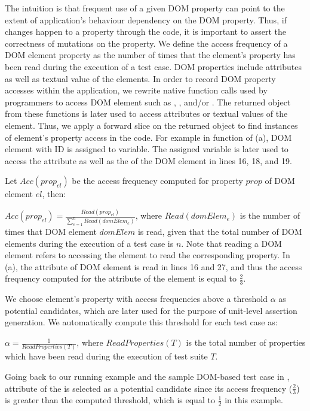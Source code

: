 The intuition is that frequent use of a given DOM property can point to the extent of application's behaviour dependency on the DOM property. Thus, if changes happen to a property through the \javascript code, it is important to assert the correctness of mutations on the property. We define the access frequency of a DOM element property as the number of times that the element's property has been read during the execution of a test case. DOM properties include attributes as well as textual value of the elements.
In order to record DOM property accesses within the application, we rewrite native function calls used by programmers to access DOM element such as , , and/or . The returned object from these functions is later used to access attributes or textual values of the element. Thus, we apply a forward slice on the returned object to find instances of element's property access in the code.
For example in function  of (a), DOM element with ID  is assigned to  variable. The assigned variable is later used to access the  attribute as well as the 
of the DOM element in lines 16, 18, and 19.

Let $Acc(prop_{el})$ be the access frequency computed for property $prop$ of DOM element $el$, then:
 
$Acc(prop_{el})=\frac{Read(prop_{el})}{\sum _{e=1}^{n} Read(domElem_e)}$, where $Read(domElem_{e})$ is the number of times that DOM element $domElem$ is read, given that the total number of DOM elements during the execution of a test case is $n$.
Note that reading a DOM element refers to accessing the element to read the corresponding property. In (a), the  attribute of DOM element  is read in lines 16 and 27, and thus the access frequency
computed for the  attribute of the element is equal to $\frac{2}{3}$.

We choose element's property with access frequencies above a threshold $\alpha$ as potential candidates, which are later used for the purpose of unit-level assertion generation. We automatically compute this threshold for each test case as: 

$\alpha=\frac{1}{ReadProperties(T)}$, where $ReadProperties(T)$ is the total number of properties which have been read during the execution of test suite $T$.

Going back to our running example and the sample DOM-based test case in ,  attribute of the  is selected as a potential candidate since its access frequency ($\frac{2}{3}$) is greater than the computed threshold, which is equal to $\frac{1}{2}$ in this example.        
